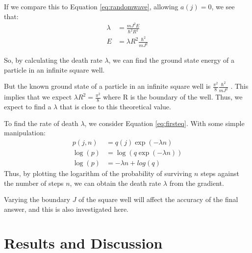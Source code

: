 \documentclass[journal]{IEEEtran}
\begin{document}
If we compare this to Equation \ref{eq:randomwave}, allowing $a(j) = 0$, we see
that:
\begin{equation}
  \begin{split}
    \lambda &= \frac{mJ^2E}{\hbar^2R^2} \\
    E &= \lambda R^2 \frac{\hbar^2}{mJ^2}
  \end{split}
  \nonumber
\end{equation}

So, by calculating the death rate $\lambda$, we can find the ground state energy
of a particle in an infinite square well.

But the known ground state of a particle in an infinite square well is
$\frac{\pi^2}{8}\frac{\hbar^2}{mJ^2}$ . This implies that we expect $\lambda
R^2=\frac{\pi^2}{8}$ where R is the boundary of the well. Thus, we expect to
find a $\lambda$ that is close to this theoretical value.


To find the rate of death $\lambda$, we consider Equation \ref{eq:firsteq}. With
some simple manipulation:
\begin{equation}
  \begin{split}
    p(j, n) & = q(j) \exp(-\lambda n)\\
    \log(p) & = \log(q \exp(-\lambda n)) \\
    \log(p) & = -\lambda n + log(q)
  \end{split}
  \nonumber
\end{equation}
Thus, by plotting the logarithm of the probability of surviving $n$ steps
against the number of steps $n$, we can obtain the death rate $\lambda$ from the
gradient.

Varying the boundary $J$ of the square well will affect the accuracy of the
final answer, and this is also investigated here.


\section{Results and Discussion}
\end{document}
